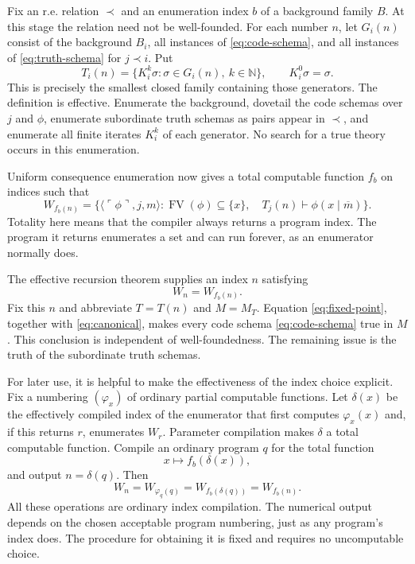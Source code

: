 \documentclass[11pt]{article}
\theoremstyle{definition}
\newcommand{\N}{\mathbb N}
\newcommand{\FV}{\operatorname{FV}}
\newcommand{\code}[1]{\ulcorner #1\urcorner}
\newcommand{\num}[1]{\overline{#1}}
\begin{document}
Fix an r.e. relation $\prec$ and an enumeration index $b$ of a background
family $B$. At this stage the relation need not be well-founded. For each
number $n$, let $G_i(n)$ consist of the background $B_i$, all instances of
\eqref{eq:code-schema}, and all instances of \eqref{eq:truth-schema} for
$j\prec i$. Put
\begin{equation}\label{eq:finite-closure}
 T_i(n)=\{K_i^k\sigma:\sigma\in G_i(n),\ k\in\N\},
 \qquad K_i^0\sigma=\sigma.
\end{equation}
This is precisely the smallest closed family containing those generators.
The definition is effective. Enumerate the background, dovetail the code
schemas over $j$ and $\phi$, enumerate subordinate truth schemas as pairs
appear in $\prec$, and enumerate all finite iterates $K_i^k$ of each
generator. No search for a true theory occurs in this enumeration.

Uniform consequence enumeration now gives a total computable function
$f_b$ on indices such that
\begin{equation}\label{eq:index-map}
 W_{f_b(n)}=
 \bigl\{\langle\code{\phi},j,m\rangle:
 \FV(\phi)\subseteq\{x\},\quad
 T_j(n)\vdash\phi(x\mid\num m)\bigr\}.
\end{equation}
Totality here means that the compiler always returns a program index. The
program it returns enumerates a set and can run forever, as an enumerator
normally does.

The effective recursion theorem supplies an index $n$ satisfying
\begin{equation}\label{eq:fixed-point}
 W_n=W_{f_b(n)}.
\end{equation}
Fix this $n$ and abbreviate $T=T(n)$ and $M=M_T$. Equation
\eqref{eq:fixed-point}, together with \eqref{eq:canonical}, makes every
code schema \eqref{eq:code-schema} true in $M$. This conclusion is
independent of well-foundedness. The remaining issue is the truth of the
subordinate truth schemas.

For later use, it is helpful to make the effectiveness of the index choice
explicit. Fix a numbering $(\varphi_x)$ of ordinary partial computable
functions. Let $\delta(x)$ be the effectively compiled index of the
enumerator that first computes $\varphi_x(x)$ and, if this returns $r$,
enumerates $W_r$. Parameter compilation makes $\delta$ a total computable
function. Compile an ordinary program $q$ for the total function
\[
 x\longmapsto f_b(\delta(x)),
\]
and output $n=\delta(q)$. Then
\begin{equation}\label{eq:explicit-compiler}
 W_n=W_{\varphi_q(q)}
     =W_{f_b(\delta(q))}=W_{f_b(n)}.
\end{equation}
All these operations are ordinary index compilation. The numerical output
depends on the chosen acceptable program numbering, just as any program's
index does. The procedure for obtaining it is fixed and requires no
uncomputable choice.
\end{document}
